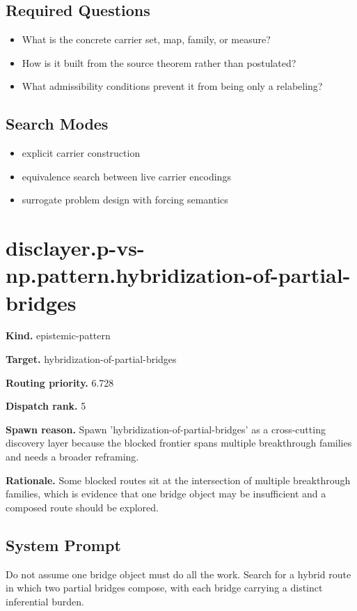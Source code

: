 \documentclass[11pt]{article}
\begin{document}
\subsection*{Required Questions}
\begin{itemize}[leftmargin=*,itemsep=0.2em]
\item What is the concrete carrier set, map, family, or measure?
\item How is it built from the source theorem rather than postulated?
\item What admissibility conditions prevent it from being only a relabeling?
\end{itemize}
\subsection*{Search Modes}
\begin{itemize}[leftmargin=*,itemsep=0.2em]
\item explicit carrier construction
\item equivalence search between live carrier encodings
\item surrogate problem design with forcing semantics
\end{itemize}
\section{disclayer.p-vs-np.pattern.hybridization-of-partial-bridges}
\textbf{Kind.} epistemic-pattern

\textbf{Target.} hybridization-of-partial-bridges

\textbf{Routing priority.} 6.728

\textbf{Dispatch rank.} 5

\textbf{Spawn reason.} Spawn 'hybridization-of-partial-bridges' as a cross-cutting discovery layer because the blocked frontier spans multiple breakthrough families and needs a broader reframing.

\textbf{Rationale.} Some blocked routes sit at the intersection of multiple breakthrough families, which is evidence that one bridge object may be insufficient and a composed route should be explored.

\subsection*{System Prompt}
Do not assume one bridge object must do all the work. Search for a hybrid route in which two partial bridges compose, with each bridge carrying a distinct inferential burden.
\end{document}
